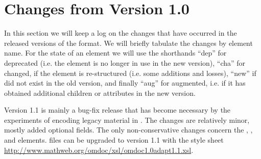 \chapter{Changes from Version 1.0}\label{sec:changelog}

In this section we will keep a log on the changes that have occurred in the
released versions of the {\omdoc} format. We will briefly tabulate the changes by
element name. For the state of an element we will use the shorthands ``dep'' for
deprecated (i.e. the element is no longer in use in the new {\omdoc} version),
``cha'' for changed, if the element is re-structured (i.e.  some additions and
losses), ``new'' if did not exist in the old {\omdoc} version, and finally ``aug''
for augmented, i.e. if it has obtained additional children or attributes in the
new {\omdoc} version.

Version 1.1 is mainly a bug-fix release that has become necessary by the
experiments of encoding legacy material in {\omdoc}. The changes are relatively
minor, mostly added optional fields. The only non-conservative changes concern the
{}, {}, {} and
{} elements.  {\omdoc} files can be upgraded to version 1.1
with the {\xslt} style sheet
{\url{http://www.mathweb.org/omdoc/xsl/omdoc1.0adapt1.1.xsl}}.

